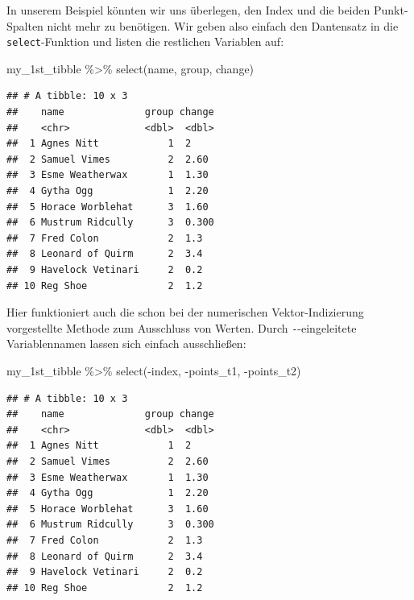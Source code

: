 \documentclass[
]{book}
\newenvironment{Shaded}{\begin{snugshade}}{\end{snugshade}}
\newcommand{\FunctionTok}[1]{\textcolor[rgb]{0.00,0.00,0.00}{#1}}
\newcommand{\NormalTok}[1]{#1}
\newcommand{\SpecialCharTok}[1]{\textcolor[rgb]{0.00,0.00,0.00}{#1}}
\begin{document}
In unserem Beispiel könnten wir uns überlegen, den Index und die beiden Punkt-Spalten nicht mehr zu benötigen. Wir geben also einfach den Dantensatz in die \texttt{select}-Funktion und listen die restlichen Variablen auf:

\begin{Shaded}
\begin{Highlighting}[]
\NormalTok{my\_1st\_tibble }\SpecialCharTok{\%\textgreater{}\%} 
  \FunctionTok{select}\NormalTok{(name, group, change)}
\end{Highlighting}
\end{Shaded}

\begin{verbatim}
## # A tibble: 10 x 3
##    name              group change
##    <chr>             <dbl>  <dbl>
##  1 Agnes Nitt            1  2    
##  2 Samuel Vimes          2  2.60 
##  3 Esme Weatherwax       1  1.30 
##  4 Gytha Ogg             1  2.20 
##  5 Horace Worblehat      3  1.60 
##  6 Mustrum Ridcully      3  0.300
##  7 Fred Colon            2  1.3  
##  8 Leonard of Quirm      2  3.4  
##  9 Havelock Vetinari     2  0.2  
## 10 Reg Shoe              2  1.2
\end{verbatim}

Hier funktioniert auch die schon bei der numerischen Vektor-Indizierung vorgestellte Methode zum Ausschluss von Werten. Durch \texttt{-}-eingeleitete Variablennamen lassen sich einfach ausschließen:

\begin{Shaded}
\begin{Highlighting}[]
\NormalTok{my\_1st\_tibble }\SpecialCharTok{\%\textgreater{}\%} 
  \FunctionTok{select}\NormalTok{(}\SpecialCharTok{{-}}\NormalTok{index, }\SpecialCharTok{{-}}\NormalTok{points\_t1, }\SpecialCharTok{{-}}\NormalTok{points\_t2) }
\end{Highlighting}
\end{Shaded}

\begin{verbatim}
## # A tibble: 10 x 3
##    name              group change
##    <chr>             <dbl>  <dbl>
##  1 Agnes Nitt            1  2    
##  2 Samuel Vimes          2  2.60 
##  3 Esme Weatherwax       1  1.30 
##  4 Gytha Ogg             1  2.20 
##  5 Horace Worblehat      3  1.60 
##  6 Mustrum Ridcully      3  0.300
##  7 Fred Colon            2  1.3  
##  8 Leonard of Quirm      2  3.4  
##  9 Havelock Vetinari     2  0.2  
## 10 Reg Shoe              2  1.2
\end{verbatim}
\end{document}
